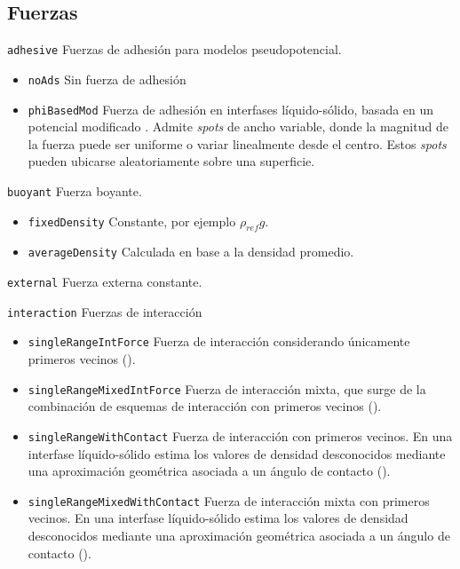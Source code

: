 \subsection{Fuerzas}

\texttt{adhesive}\: Fuerzas de adhesi\'on para modelos pseudopotencial.

\begin{itemize}
	\renewcommand{\labelitemi}{\hspace{2cm}}
	\setlength\itemsep{0.2em}
	\item \texttt{noAds}\: Sin fuerza de adhesi\'on
	\item \texttt{phiBasedMod}\: Fuerza de adhesi\'on en interfases l\'iquido-s\'olido, basada en un potencial modificado \cite{li_contact_2014}. Admite \emph{spots} de ancho variable, donde la magnitud de la fuerza puede ser uniforme o variar linealmente desde el centro. Estos \emph{spots} pueden ubicarse aleatoriamente sobre una superficie.
\end{itemize}
\medskip

\texttt{buoyant}\: Fuerza boyante. 

\begin{itemize}
	\renewcommand{\labelitemi}{\:}
	\item \texttt{fixedDensity}\: Constante, por ejemplo $\rho_{ref}g$.
	\item \texttt{averageDensity}\: Calculada en base a la densidad promedio.
\end{itemize}
\medskip

\texttt{external}\: Fuerza externa constante.
\medskip

\texttt{interaction}\: Fuerzas de interacci\'on

\begin{itemize}
	\renewcommand{\labelitemi}{\:}
	\item \texttt{singleRangeIntForce}\: Fuerza de interacci\'on considerando \'unicamente primeros vecinos ().
	\item \texttt{singleRangeMixedIntForce}\: Fuerza de interacci\'on mixta, que surge de la combinaci\'on de esquemas de interacci\'on con primeros vecinos ().
	\item \texttt{singleRangeWithContact}\: Fuerza de interacci\'on con primeros vecinos. En una interfase l\'iquido-s\'olido estima los valores de densidad desconocidos mediante una aproximaci\'on geom\'etrica asociada a un \'angulo de contacto ().
	\item \texttt{singleRangeMixedWithContact}\: Fuerza de interacci\'on mixta con primeros vecinos. En una interfase l\'iquido-s\'olido estima los valores de densidad desconocidos mediante una aproximaci\'on geom\'etrica asociada a un \'angulo de contacto ().	
\end{itemize}
\medskip


